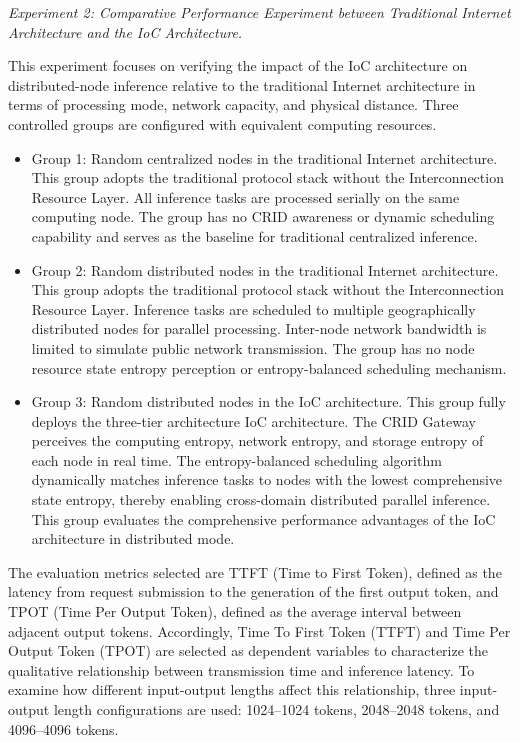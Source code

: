 \documentclass{ccjnl}
\begin{document}
\par
{}
\noindent\textit{Experiment 2: Comparative Performance Experiment between Traditional Internet Architecture and the IoC Architecture.}\par

This experiment focuses on verifying the impact of the IoC architecture on distributed-node inference relative to the traditional Internet architecture in terms of processing mode, network capacity, and physical distance. Three controlled groups are configured with equivalent computing resources.

\begin{itemize}[nosep]
	\item Group 1: Random centralized nodes in the traditional Internet architecture. This group adopts the traditional protocol stack without the Interconnection Resource Layer. All inference tasks are processed serially on the same computing node. The group has no CRID awareness or dynamic scheduling capability and serves as the baseline for traditional centralized inference.
	
	\item Group 2: Random distributed nodes in the traditional Internet architecture. This group adopts the traditional protocol stack without the Interconnection Resource Layer. Inference tasks are scheduled to multiple geographically distributed nodes for parallel processing. Inter-node network bandwidth is limited to simulate public network transmission. The group has no node resource state entropy perception or entropy-balanced scheduling mechanism.
	
	\item Group 3: Random distributed nodes in the IoC architecture. This group fully deploys the three-tier architecture IoC architecture. The CRID Gateway perceives the computing entropy, network entropy, and storage entropy of each node in real time. The entropy-balanced scheduling algorithm dynamically matches inference tasks to nodes with the lowest comprehensive state entropy, thereby enabling cross-domain distributed parallel inference. This group evaluates the comprehensive performance advantages of the IoC architecture in distributed mode.
\end{itemize}

The evaluation metrics selected are TTFT (Time to First Token), defined as the latency from request submission to the generation of the first output token, and TPOT (Time Per Output Token), defined as the average interval between adjacent output tokens. Accordingly, Time To First Token (TTFT) and Time Per Output Token (TPOT) are selected as dependent variables to characterize the qualitative relationship between transmission time and inference latency. To examine how different input-output lengths affect this relationship, three input-output length configurations are used: 1024--1024 tokens, 2048--2048 tokens, and 4096--4096 tokens.
\end{document}

